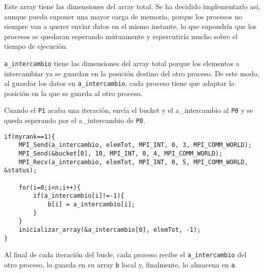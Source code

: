 Este array tiene las dimensiones del array total. Se ha decidido implementarlo así, aunque pueda suponer una mayor carga de memoria, porque los procesos no siempre van a querer enviar datos en el mismo instante, lo que supondría que los procesos se quedaran esperando mútuamente y repercutiría mucho sobre el tiempo de ejecución.

\texttt{a\_intercambio} tiene las dimensiones del array total porque los elementos a intercambiar ya se guardan en la posición destino del otro proceso. De este modo, al guardar los datos en \texttt{a\_intercambio}, cada proceso tiene que adaptar la posición en la que se guarda al otro proceso.


Cuando el \texttt{P1} acaba una iteración, envía el bucket y el a\_intercambio al \texttt{P0} y se queda esperando por el a\_intercambio de \texttt{P0}.
\begin{lstlisting}[frame=single]
if(myrank==1){
	MPI_Send(a_intercambio, elemTot, MPI_INT, 0, 3, MPI_COMM_WORLD);
	MPI_Send(&bucket[0], 10, MPI_INT, 0, 4, MPI_COMM_WORLD);
	MPI_Recv(a_intercambio, elemTot, MPI_INT, 0, 5, MPI_COMM_WORLD, &status);

	for(i=0;i<n;i++){
		if(a_intercambio[i]!=-1){
			b[i] = a_intercambio[i];
		}
	}
	inicializar_array(&a_intercambio[0], elemTot, -1);
}
\end{lstlisting}

Al final de cada iteración del bucle, cada proceso recibe el \texttt{a\_intercambio} del otro proceso, lo guarda en su array \texttt{b} local y, finalmente, lo almacena en \texttt{a}.
